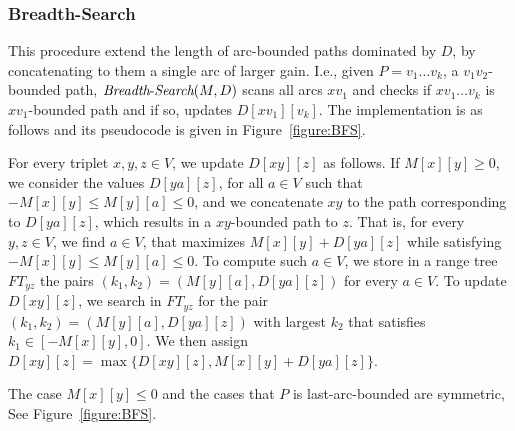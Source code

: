 \documentclass[11pt]{article}
\newcommand{\BFS}{\mbox{{\it Breadth}-{\it Search}}}
\begin{document}
\subsubsection{Breadth-Search}\label{section:BFS}
This procedure extend the length of arc-bounded paths dominated by $D$, by concatenating to them a single arc of larger gain. I.e., given $P = v_1 \ldots v_k$, a $v_1 v_2$-bounded path, $\BFS(M,D)$ scans all arcs $xv_1$ and checks if $xv_1 \ldots v_k$ is $x v_1$-bounded path and if so, updates $D[xv_1][v_k]$. The implementation is as follows and its pseudocode is given in Figure~\ref{figure:BFS}. 

For every triplet $x,y,z\in V$, we update $D[xy][z]$ as follows. If $M[x][y]\ge 0$, we consider the values $D[ya][z]$, for all $a\in V$ such that $-M[x][y] \le  M[y][a] \le 0$, and we concatenate $xy$ to the path corresponding to $D[ya][z]$, which results in a $xy$-bounded path to $z$.  That is, for every $y,z\in V$, we find $a \in V$,  that maximizes $M[x][y]+D[ya][z]$ while satisfying  $-M[x][y] \le  M[y][a] \le 0$. To compute such $a\in V$, we store in a range tree $FT_{yz}$ the pairs $(k_1,k_2)=(M[y][a],D[ya][z])$ for every $a\in V$.
To update $D[xy][z]$, we search in $FT_{yz}$ for the pair $(k_1,k_2)=(M[y][a],D[ya][z])$ with largest $k_2$ that satisfies $k_1 \in [-M[x][y],0]$. We then assign $D[xy][z] = \max \{D[xy][z], M[x][y] + D[ya][z] \}$.

The case $M[x][y]\le 0$ and the cases that $P$ is last-arc-bounded are symmetric, See Figure~\ref{figure:BFS}.
\end{document}
